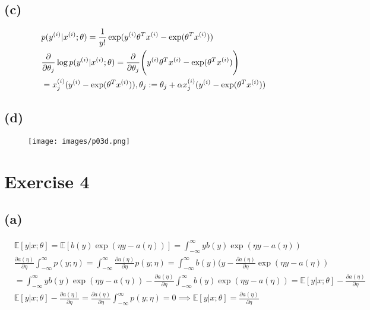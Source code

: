 \documentclass{article}
\begin{document}
\subsection*{(c)}

\begin{align*}
    & p(y^{(i)}|x^{(i)};\theta)=\frac{1}{y!}\exp(y^{(i)}\theta^{T}x^{(i)}-\exp(\theta^{T}x^{(i)}))                                                                          \\
    & \frac{\partial}{\partial\theta_{j}}\log p(y^{(i)}|x^{(i)};\theta)=\frac{\partial}{\partial\theta_{j}}\Bigg{(}y^{(i)}\theta^{T}x^{(i)}-\exp(\theta^{T}x^{(i)})\Bigg{)} \\
    & = x^{(i)}_j(y^{(i)}-\exp(\theta^{T}x^{(i)})), \theta_{j} := \theta_{j} + \alpha x^{(i)}_j(y^{(i)}-\exp(\theta^{T}x^{(i)}))
\end{align*}

\newpage

\subsection*{(d)}

\begin{figure}[h]
  \centering
  \texttt{[image: images/p03d.png]}
\end{figure}

\newpage

\section*{Exercise 4}
\subsection*{(a)}
\begin{align*}
    & \mathbb{E}[y|x;\theta]=\mathbb{E}[b(y)\exp(\eta y-a(\eta))]=\int_{-\infty}^{\infty}yb(y)\exp(\eta y-a(\eta))                                                                                                                        \\
    & \frac{\partial a(\eta)}{\partial\eta}\int_{-\infty}^{\infty}p(y;\eta)=\int_{-\infty}^{\infty}\frac{\partial a(\eta)}{\partial\eta}p(y;\eta)=\int_{-\infty}^{\infty}b(y)(y-\frac{\partial a(\eta)}{\partial\eta}\exp(\eta y-a(\eta)) \\
    & =\int_{-\infty}^{\infty}yb(y)\exp(\eta y-a(\eta))-\frac{\partial a(\eta)}{\partial\eta}\int_{-\infty}^{\infty}b(y)\exp(\eta y-a(\eta))=\mathbb{E}[y|x;\theta]-\frac{\partial a(\eta)}{\partial\eta}                                 \\
    & \mathbb{E}[y|x;\theta]-\frac{\partial a(\eta)}{\partial\eta}=\frac{\partial a(\eta)}{\partial\eta}\int_{-\infty}^{\infty}p(y;\eta)=0\implies \mathbb{E}[y|x;\theta]=\frac{\partial a(\eta)}{\partial\eta}
\end{align*}
\end{document}
